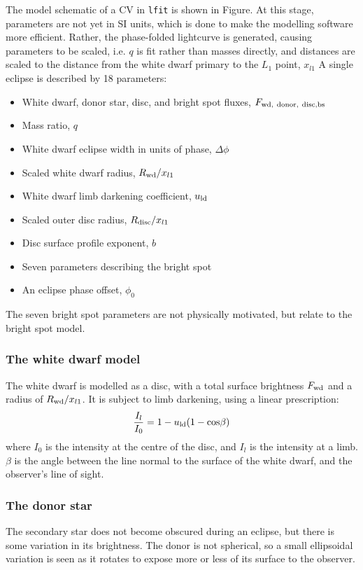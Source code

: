 The model schematic of a CV in \lstinline{lfit} is shown in Figure. At this stage, parameters are not yet in SI units, which is done to make the modelling software more efficient. Rather, the phase-folded lightcurve is generated, causing parameters to be scaled, i.e. $q$ is fit rather than masses directly, and distances are scaled to the distance from the white dwarf primary to the $L_1$ point, $x_{l1}$
A single eclipse is described by 18 parameters:
\begin{itemize}
    \item White dwarf, donor star, disc, and bright spot fluxes, $F_{\rm wd,\ donor,\ disc, bs}$
    \item Mass ratio, $q$
    \item White dwarf eclipse width in units of phase, $\Delta \phi$
    \item Scaled white dwarf radius, $R_{\rm wd} / x_{l1}$
    \item White dwarf limb darkening coefficient, $u_{\rm ld}$
    \item Scaled outer disc radius, $R_{\rm disc} / x_{l1}$
    \item Disc surface profile exponent, $b$
    \item Seven parameters describing the bright spot
    \item An eclipse phase offset, $\phi_0$
\end{itemize}
The seven bright spot parameters are not physically motivated, but relate to the bright spot model.

\subsubsection{The white dwarf model}

The white dwarf is modelled as a disc, with a total surface brightness $F_{\rm wd}$ and a radius of $R_{\rm wd} / x_{l1}$. It is subject to limb darkening, using a linear prescription:
\begin{equation}
    \frac{I_l}{I_0} = 1 - u_{\rm ld}(1 - {\rm cos}\beta)
\end{equation}
where $I_0$ is the intensity at the centre of the disc, and $I_l$ is the intensity at a limb. $\beta$ is the angle between the line normal to the surface of the white dwarf, and the observer's line of sight.

\subsubsection{The donor star}
The secondary star does not become obscured during an eclipse, but there is some variation in its brightness. The donor is not spherical, so a small ellipsoidal variation is seen as it rotates to expose more or less of its surface to the observer.

